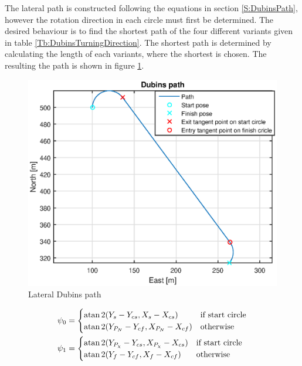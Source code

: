 The lateral path is constructed following the equations in section \ref{S:DubinsPath}, however the rotation direction in each circle must first be determined. The desired behaviour is to find the shortest path of the four different variants given in table \ref{Tb:DubinsTurningDirection}. The shortest path is determined by calculating the length of each variants, where the shortest is chosen. The resulting the path is shown in figure \ref{Fig:LateralPath}.
\begin{figure}[H]
	\centering
		\includegraphics[width=1\textwidth]{figs/SysPlot/DubinsPath.eps}
		\caption{Lateral Dubins path}
		\label{Fig:LateralPath}
\end{figure}

\begin{subequations}
\begin{align}
\psi_0 &= \begin{cases}
\operatorname{atan}2(Y_s-Y_{cs},X_s-X_{cs}) & \text{if start circle} \\
\operatorname{atan}2(Y_{P_N}-Y_{cf},X_{P_N}-X_{cf}) & \text{otherwise}
\end{cases}\\
\psi_1 &= \begin{cases}
\operatorname{atan}2(Y_{P_\chi}-Y_{cs},X_{P_{\chi}}-X_{cs}) & \text{if start circle} \\
\operatorname{atan}2(Y_{f}-Y_{cf},X_{f}-X_{cf}) & \text{otherwise}
\end{cases}
\end{align}
\end{subequations}

